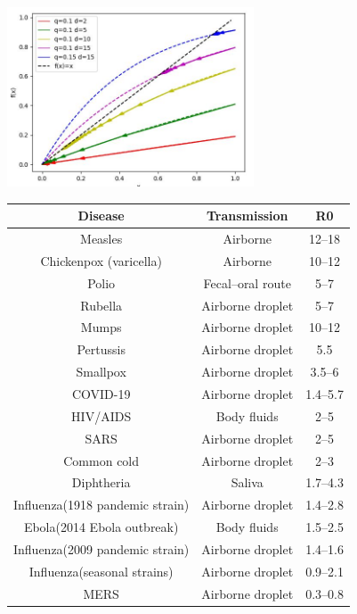 {
\centering
\includegraphics[width=0.55\textwidth]{notes/img/n3_prob_recursion.JPG} \par
}

\begin{table}[h]
\centering
\begin{tabular}{c|c|c}
\textbf{Disease}                & \textbf{Transmission} & \textbf{R0} \\\hline\hline
Measles                         & Airborne              & 12–18       \\
Chickenpox (varicella)          & Airborne              & 10–12       \\
Polio                           & Fecal–oral route      & 5–7         \\
Rubella                         & Airborne droplet      & 5–7         \\
Mumps                           & Airborne droplet      & 10–12       \\
Pertussis                       & Airborne droplet      & 5.5         \\
Smallpox                        & Airborne droplet      & 3.5–6       \\
COVID-19                        & Airborne droplet      & 1.4–5.7     \\
HIV/AIDS                        & Body fluids           & 2–5         \\
SARS                            & Airborne droplet      & 2–5         \\
Common cold                     & Airborne droplet      & 2–3         \\
Diphtheria                      & Saliva                & 1.7–4.3     \\
Influenza(1918 pandemic strain) & Airborne droplet      & 1.4–2.8     \\
Ebola(2014 Ebola outbreak)      & Body fluids           & 1.5–2.5     \\
Influenza(2009 pandemic strain) & Airborne droplet      & 1.4–1.6     \\
Influenza(seasonal strains)     & Airborne droplet      & 0.9–2.1     \\
MERS                            & Airborne droplet      & 0.3–0.8    
\end{tabular}
\end{table}

